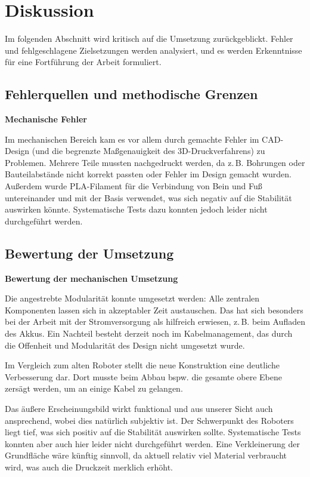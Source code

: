 \section{Diskussion}
\label{sec:diskussion}

Im folgenden Abschnitt wird kritisch auf die Umsetzung zurückgeblickt. Fehler und fehlgeschlagene Zielsetzungen werden analysiert, und es werden Erkenntnisse für eine Fortführung der Arbeit formuliert.

\subsection{Fehlerquellen und methodische Grenzen}

\textbf{Mechanische Fehler}

Im mechanischen Bereich kam es vor allem durch gemachte Fehler im CAD-Design (und die begrenzte Maßgenauigkeit des 3D-Druckverfahrens) zu Problemen. Mehrere Teile mussten nachgedruckt werden, da z.\,B. Bohrungen oder Bauteilabstände nicht korrekt passten oder Fehler im Design gemacht wurden. 
Außerdem wurde PLA-Filament für die Verbindung von Bein und Fuß untereinander und mit der Basis verwendet, was sich negativ auf die Stabilität auswirken könnte. Systematische Tests dazu konnten jedoch leider nicht durchgeführt werden.

\subsection{Bewertung der Umsetzung}

\textbf{Bewertung der mechanischen Umsetzung}

Die angestrebte Modularität konnte umgesetzt werden: Alle zentralen Komponenten lassen sich in akzeptabler Zeit austauschen. Das hat sich besonders bei der Arbeit mit der Stromversorgung als hilfreich erwiesen, z.\,B. beim Aufladen des Akkus. Ein Nachteil besteht derzeit noch im Kabelmanagement, das durch die Offenheit und Modularität des Design nicht umgesetzt wurde.

Im Vergleich zum alten Roboter stellt die neue Konstruktion eine deutliche Verbesserung dar. Dort musste beim Abbau bspw. die gesamte obere Ebene zersägt werden, um an einige Kabel zu gelangen.

Das äußere Erscheinungsbild wirkt funktional und aus unserer Sicht auch ansprechend, wobei dies natürlich subjektiv ist. Der Schwerpunkt des Roboters liegt tief, was sich positiv auf die Stabilität auswirken sollte. Systematische Tests konnten aber auch hier leider nicht durchgeführt werden. Eine Verkleinerung der Grundfläche wäre künftig sinnvoll, da aktuell relativ viel Material verbraucht wird, was auch die Druckzeit merklich erhöht. 

